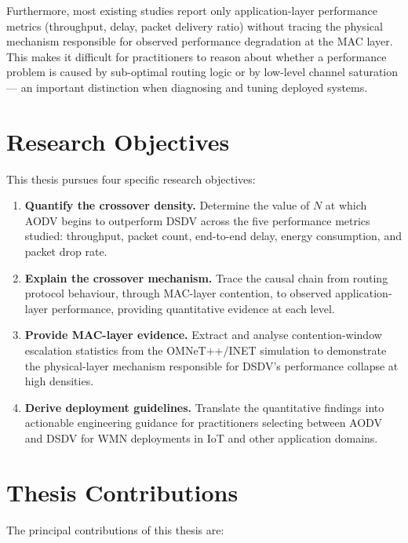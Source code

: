 Furthermore, most existing studies report only application-layer performance metrics
(throughput, delay, packet delivery ratio) without tracing the physical mechanism
responsible for observed performance degradation at the MAC layer. This makes it
difficult for practitioners to reason about whether a performance problem is caused by
sub-optimal routing logic or by low-level channel saturation --- an important distinction
when diagnosing and tuning deployed systems.

\section{Research Objectives}

This thesis pursues four specific research objectives:

\begin{enumerate}
  \item \textbf{Quantify the crossover density.} Determine the value of $N$ at which
    AODV begins to outperform DSDV across the five performance metrics studied:
    throughput, packet count, end-to-end delay, energy consumption, and packet drop rate.
  \item \textbf{Explain the crossover mechanism.} Trace the causal chain from routing
    protocol behaviour, through MAC-layer contention, to observed application-layer
    performance, providing quantitative evidence at each level.
  \item \textbf{Provide MAC-layer evidence.} Extract and analyse contention-window
    escalation statistics from the OMNeT++/INET simulation to demonstrate the
    physical-layer mechanism responsible for DSDV's performance collapse at high densities.
  \item \textbf{Derive deployment guidelines.} Translate the quantitative findings into
    actionable engineering guidance for practitioners selecting between AODV and DSDV
    for WMN deployments in IoT and other application domains.
\end{enumerate}

\section{Thesis Contributions}

The principal contributions of this thesis are:

